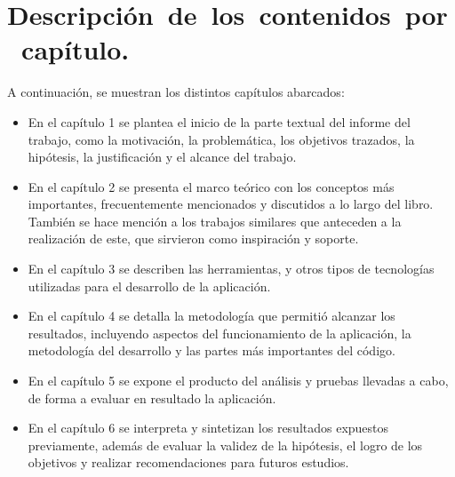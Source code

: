 \section{\mbox{Descripción de los contenidos por capítulo.}}
A continuación, se muestran los distintos capítulos abarcados:
\begin{itemize}
    \item En el capítulo 1 se plantea el inicio de la parte textual del informe del trabajo, como la motivación, la problemática, los objetivos trazados, la hipótesis, la justificación y el alcance del trabajo.
    
    \item En el capítulo 2 se presenta el marco teórico con los conceptos más importantes, frecuentemente mencionados y discutidos a lo largo del libro. También se hace mención a los trabajos similares que anteceden a la realización de este, que sirvieron como inspiración y soporte.
    
    \item En el capítulo 3 se describen las herramientas, y otros tipos de tecnologías utilizadas para el desarrollo de la aplicación.
    
    \item En el capítulo 4 se detalla la metodología que permitió alcanzar los resultados, incluyendo aspectos del funcionamiento de la aplicación, la metodología del desarrollo y las partes más importantes del código.
    
    \item En el capítulo 5 se expone el producto del análisis y pruebas llevadas a cabo, de forma a evaluar en resultado la aplicación.
    
    \item En el capítulo 6 se interpreta y sintetizan los resultados expuestos previamente, además de evaluar la validez de la hipótesis, el logro de los objetivos y realizar recomendaciones para futuros estudios.
\end{itemize}
